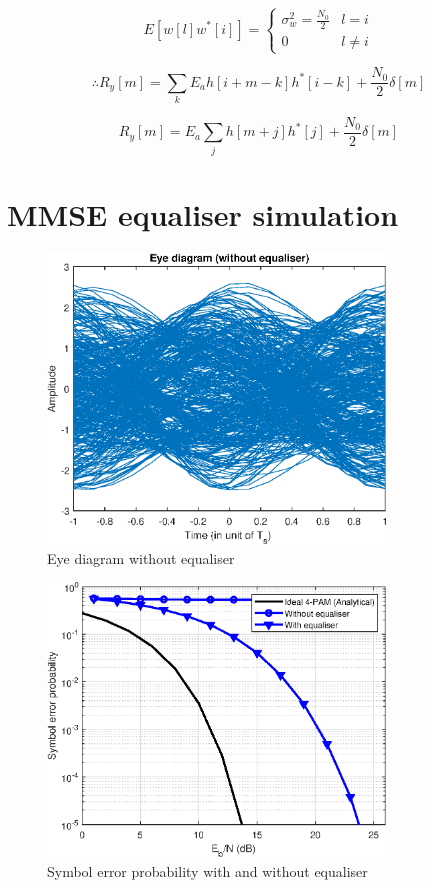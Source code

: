 \documentclass[11pt]{article}
\begin{document}
\begin{equation}
    E \left[w[l]w^*[i]\right] =
    \begin{cases}
        \sigma^2_w = \frac{N_0}{2} & l = i    \\
        0                          & l \neq i
    \end{cases}
\end{equation}

\begin{equation}
    \therefore R_y[m] = \sum_k E_a h[i+m-k]h^*[i-k]+\frac{N_0}{2}\delta[m]
\end{equation}

\begin{equation}
    R_y[m] = E_a \sum_j h[m+j]h^*[j]+\frac{N_0}{2}\delta[m]
\end{equation}

\section{MMSE equaliser simulation}

\begin{figure}[H]
    \centering
    \includegraphics[width=0.8\textwidth]{plots/multipath_eye.eps}
    \caption{Eye diagram without equaliser}
\end{figure}

\begin{figure}[H]
    \centering
    \includegraphics[width=0.8\textwidth]{plots/symbol_error_eq.eps}
    \caption{Symbol error probability with and without equaliser}
\end{figure}
\end{document}
